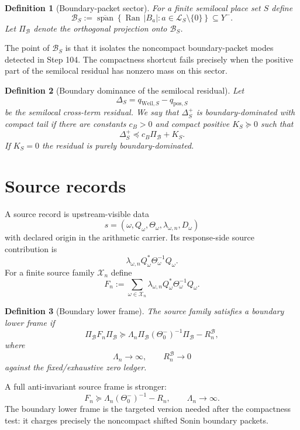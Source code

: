 \documentclass[11pt]{article}
\newtheorem{definition}{Definition}
\begin{document}
\begin{definition}[Boundary-packet sector]
For a finite semilocal place set $S$ define
\[
  \mathcal B_S
  :=
  \overline{\operatorname{span}}
  \left\{
    \operatorname{Ran}\,|B_a|:
    a\in\mathcal L_S\setminus\{0\}
  \right\}\subseteq Y^-.
\]
Let $\Pi_{\mathcal B}$ denote the orthogonal projection onto $\mathcal B_S$.
\end{definition}

The point of $\mathcal B_S$ is that it isolates the noncompact boundary-packet modes detected in Step 104.  The compactness shortcut fails precisely when the positive part of the semilocal residual has nonzero mass on this sector.

\begin{definition}[Boundary dominance of the semilocal residual]
Let
\[
  \Delta_S=q_{\mathrm{Weil},S}-q_{\mathrm{pos},S}
\]
be the semilocal cross-term residual.  We say that $\Delta_S^+$ is boundary-dominated with compact tail if there are constants $c_B>0$ and compact positive $K_S\succeq0$ such that
\[
  \Delta_S^+
  \preceq
  c_B\Pi_{\mathcal B}+K_S.
\]
If $K_S=0$ the residual is purely boundary-dominated.
\end{definition}

\section{Source records}
A source record is upstream-visible data
\[
  s=(\omega,Q_\omega,\Theta_\omega,\lambda_{\omega,n},D_\omega)
\]
with declared origin in the arithmetic carrier.  Its response-side source contribution is
\[
  \lambda_{\omega,n}Q_\omega^*\Theta_\omega^{-1}Q_\omega.
\]
For a finite source family $\mathcal X_n$ define
\[
  F_n
  :=
  \sum_{\omega\in\mathcal X_n}
  \lambda_{\omega,n}Q_\omega^*\Theta_\omega^{-1}Q_\omega.
\]

\begin{definition}[Boundary lower frame]
The source family satisfies a boundary lower frame if
\[
  \Pi_{\mathcal B}F_n\Pi_{\mathcal B}
  \succeq
  \Lambda_n\Pi_{\mathcal B}(\Theta_0^-)^{-1}\Pi_{\mathcal B}-R_n^{\mathcal B},
\]
where
\[
  \Lambda_n\to\infty,
  \qquad
  R_n^{\mathcal B}\to0
\]
against the fixed/exhaustive zero ledger.
\end{definition}

A full anti-invariant source frame is stronger:
\[
  F_n\succeq \Lambda_n(\Theta_0^-)^{-1}-R_n,
  \qquad \Lambda_n\to\infty.
\]
The boundary lower frame is the targeted version needed after the compactness test: it charges precisely the noncompact shifted Sonin boundary packets.
\end{document}
